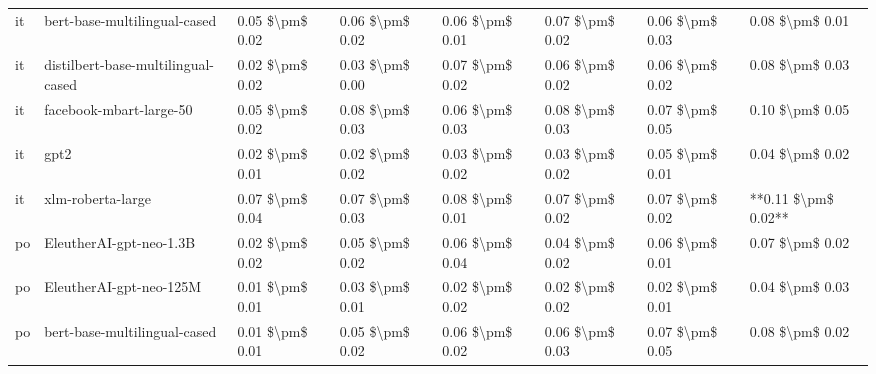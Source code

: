 \begin{tabular}{llllllll}
      it &       bert-base-multilingual-cased & 0.05 \$\textbackslash pm\$ 0.02 &           0.06 \$\textbackslash pm\$ 0.02 &       0.06 \$\textbackslash pm\$ 0.01 &        0.07 \$\textbackslash pm\$ 0.02 &                         0.06 \$\textbackslash pm\$ 0.03 &     0.08 \$\textbackslash pm\$ 0.01 \\
      it & distilbert-base-multilingual-cased & 0.02 \$\textbackslash pm\$ 0.02 &           0.03 \$\textbackslash pm\$ 0.00 &       0.07 \$\textbackslash pm\$ 0.02 &        0.06 \$\textbackslash pm\$ 0.02 &                         0.06 \$\textbackslash pm\$ 0.02 &     0.08 \$\textbackslash pm\$ 0.03 \\
      it &            facebook-mbart-large-50 & 0.05 \$\textbackslash pm\$ 0.02 &           0.08 \$\textbackslash pm\$ 0.03 &       0.06 \$\textbackslash pm\$ 0.03 &        0.08 \$\textbackslash pm\$ 0.03 &                         0.07 \$\textbackslash pm\$ 0.05 &     0.10 \$\textbackslash pm\$ 0.05 \\
      it &                               gpt2 & 0.02 \$\textbackslash pm\$ 0.01 &           0.02 \$\textbackslash pm\$ 0.02 &       0.03 \$\textbackslash pm\$ 0.02 &        0.03 \$\textbackslash pm\$ 0.02 &                         0.05 \$\textbackslash pm\$ 0.01 &     0.04 \$\textbackslash pm\$ 0.02 \\
      it &                  xlm-roberta-large & 0.07 \$\textbackslash pm\$ 0.04 &           0.07 \$\textbackslash pm\$ 0.03 &       0.08 \$\textbackslash pm\$ 0.01 &        0.07 \$\textbackslash pm\$ 0.02 &                         0.07 \$\textbackslash pm\$ 0.02 & **0.11 \$\textbackslash pm\$ 0.02** \\
      po &            EleutherAI-gpt-neo-1.3B & 0.02 \$\textbackslash pm\$ 0.02 &           0.05 \$\textbackslash pm\$ 0.02 &       0.06 \$\textbackslash pm\$ 0.04 &        0.04 \$\textbackslash pm\$ 0.02 &                         0.06 \$\textbackslash pm\$ 0.01 &     0.07 \$\textbackslash pm\$ 0.02 \\
      po &            EleutherAI-gpt-neo-125M & 0.01 \$\textbackslash pm\$ 0.01 &           0.03 \$\textbackslash pm\$ 0.01 &       0.02 \$\textbackslash pm\$ 0.02 &        0.02 \$\textbackslash pm\$ 0.02 &                         0.02 \$\textbackslash pm\$ 0.01 &     0.04 \$\textbackslash pm\$ 0.03 \\
      po &       bert-base-multilingual-cased & 0.01 \$\textbackslash pm\$ 0.01 &           0.05 \$\textbackslash pm\$ 0.02 &       0.06 \$\textbackslash pm\$ 0.02 &        0.06 \$\textbackslash pm\$ 0.03 &                         0.07 \$\textbackslash pm\$ 0.05 &     0.08 \$\textbackslash pm\$ 0.02 \\

\end{tabular}
